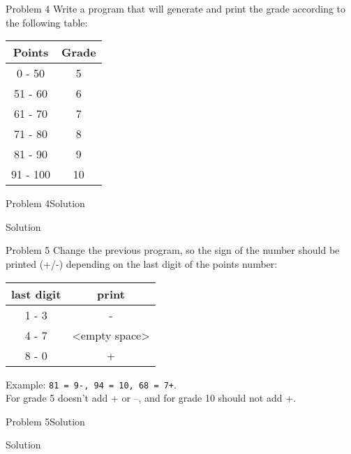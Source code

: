 \begin{frame}[fragile]{Problem 4}
Write a program that will generate and print the grade according to the
following table:
\begin{center}
\begin{tabular}{|c|c|}
\hline \textbf{Points} & \textbf{Grade} \\ 
\hline 0 - 50 & 5 \\ 
\hline 51 - 60 & 6 \\ 
\hline 61 - 70 & 7 \\ 
\hline 71 - 80 & 8 \\ 
\hline 81 - 90 & 9 \\ 
\hline 91 - 100 & 10 \\ 
\hline
\end{tabular} 
\end{center}
\end{frame}

\begin{frame}[fragile]{Problem 4}{Solution}
    \begin{exampleblock}{Solution}
    
	\end{exampleblock}
\end{frame}

\begin{frame}[fragile]{Problem 5}
Change the previous program, so the sign of the number should be printed (+/-)
depending on the last digit of the points number:
\begin{center}
\begin{tabular}{|c|c|}
\hline \textbf{last digit} & \textbf{print} \\ 
\hline 1 - 3 & - \\ 
\hline 4 - 7 & <empty space> \\ 
\hline 8 - 0 & + \\ 
\hline 
\end{tabular} 
\end{center}
Example: \texttt{81 = 9-, 94 = 10, 68 = 7+}.\\ 
For grade 5 doesn't add + or –, and for grade 10 should not add +.
\end{frame}


\begin{frame}[fragile]{Problem 5}{Solution}
	\begin{exampleblock}{Solution}
	
	\end{exampleblock}
\end{frame}


